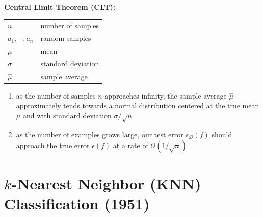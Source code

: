 \textbf{Central Limit Theorem (CLT):}
\begin{table}[H]
    \begin{minipage}{0.29\linewidth}
        \begin{customTableWrapper}{1.5}
        \begin{table}[H]
            \centering
            \begin{tabular}{l l}
                $n$ & number of samples \\
                
                $a_1, \cdots, a_n$ & random samples \\
        
                $\mu$ & mean \\
        
                $\sigma$ & standard deviation \\
        
                $\hat{\mu}$ & sample average \\
            \end{tabular}
        \end{table}
        \end{customTableWrapper}
    \end{minipage}
    \hfill
    \begin{minipage}{0.69\linewidth}
        \begin{enumerate}[itemsep=0.2cm]
            \item as the number of samples $n$ approaches infinity, the sample average $\hat{\mu}$ approximately tends towards a normal distribution centered at the true mean ${\mu}$ and with standard deviation $\sigma/\sqrt{n}$

            \item as the number of examples grows large, our test error $\epsilon_\mathcal{D}(f)$ should approach the true error $\epsilon(f)$ at a rate of $\mathcal{O}(1/\sqrt{n})$

            
        \end{enumerate}
    \end{minipage}
\end{table}



\section{$k$-Nearest Neighbor (KNN) Classification (1951) \cite{wiki/K-nearest_neighbors_algorithm, dnn-1}} \label{k-Nearest Neighbor (KNN) Classification}

